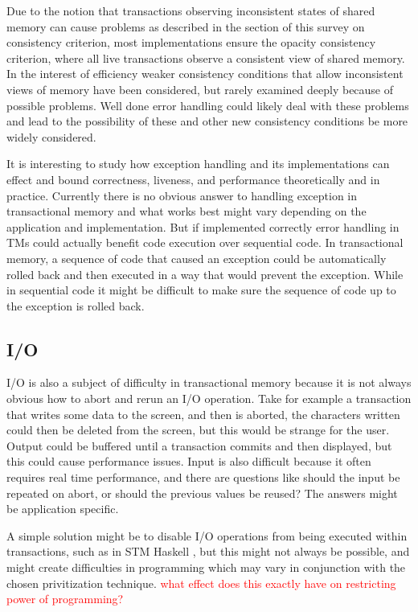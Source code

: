 Due to the notion that transactions observing inconsistent states of shared memory can cause problems as described in the section of this survey on consistency criterion, most implementations ensure the opacity consistency criterion, where all live transactions observe a consistent view of shared memory.
In the interest of efficiency weaker consistency conditions that allow inconsistent views of memory have been considered, but rarely examined deeply because of possible problems.
Well done error handling could likely deal with these problems and lead to the possibility of these and other new consistency conditions be more widely considered.

It is interesting to study how exception handling and its implementations can effect and bound correctness, liveness, and performance theoretically and in practice.
Currently there is no obvious answer to handling exception in transactional memory and what works best might vary depending on the application and implementation.
But if implemented correctly error handling in TMs could actually benefit code execution over sequential code.
In transactional memory, a sequence of code that caused an exception could be automatically rolled back and then executed in a way that would prevent the exception.
While in sequential code it might be difficult to make sure the sequence of code up to the exception is rolled back.

\subsection{I/O}
I/O is also a subject of difficulty in transactional memory because it is not always obvious how to abort and rerun an I/O operation.
Take for example a transaction that writes some data to the screen, and then is aborted, the characters written could then be deleted from the screen, but this would be strange for the user.
Output could be buffered until a transaction commits and then displayed, but this could cause performance issues.
Input is also difficult because it often requires real time performance, and there are questions like should the input be repeated on abort, or should the previous values be reused?
The answers might be application specific.

A simple solution might be to disable I/O operations from being executed within transactions, such as in STM Haskell \cite{sjbc000}, but this might not always be possible, and might create difficulties in programming which may vary in conjunction with the chosen privitization technique.
\textcolor{Red}{what effect does this exactly have on restricting power of programming?}

